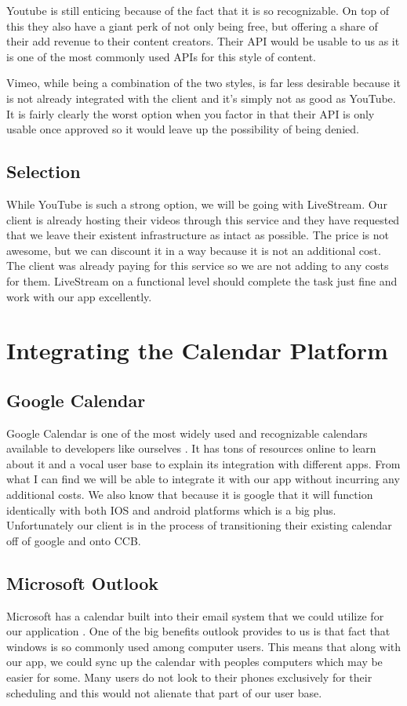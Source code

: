 \documentclass[letterpaper,10pt,draftclsnofoot,onecolumn,titlepage]{IEEEtran}
\begin{document}
	Youtube is still enticing because of the fact that it is so recognizable. On top of this they also have a giant perk of not only being free, but offering a share of their add revenue to their content creators. Their API would be usable to us as it is one of the most commonly used APIs for this style of content. 
	
	Vimeo, while being a combination of the two styles, is far less desirable because it is not already integrated with the client and it’s simply not as good as YouTube. It is fairly clearly the worst option when you factor in that their API is only usable once approved so it would leave up the possibility of being denied. 
	\subsection{Selection}
	While YouTube is such a strong option, we will be going with LiveStream. Our client is already hosting their videos through this service and they have requested that we leave their existent infrastructure as intact as possible. The price is not awesome, but we can discount it in a way because it is not an additional cost. The client was already paying for this service so we are not adding to any costs for them. LiveStream on a functional level should complete the task just fine and work with our app excellently. 
	\section{Integrating the Calendar Platform}
	\subsection{Google Calendar}
	Google Calendar is one of the most widely used and recognizable calendars available to developers like ourselves \cite{Google}. It has tons of resources online to learn about it and a vocal user base to explain its integration with different apps. From what I can find we will be able to integrate it with our app without incurring any additional costs. We also know that because it is google that it will function identically with both IOS and android platforms which is a big plus. Unfortunately our client is in the process of transitioning their existing calendar off of google and onto CCB.
	\subsection{Microsoft Outlook}
	Microsoft has a calendar built into their email system that we could utilize for our application \cite{Outlook}. One of the big benefits outlook provides to us is that fact that windows is so commonly used among computer users. This means that along with our app, we could sync up the calendar with peoples computers which may be easier for some. Many users do not look to their phones exclusively for their scheduling and this would not alienate that part of our user base.
\end{document}
